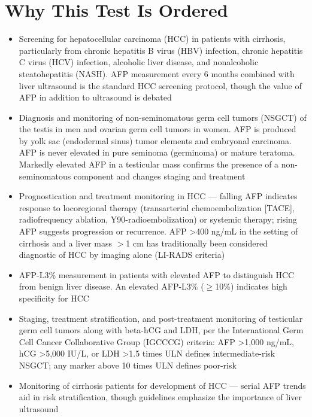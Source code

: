 \section*{Why This Test Is Ordered}
\begin{itemize}
  \item Screening for hepatocellular carcinoma (HCC) in patients with cirrhosis, particularly from chronic hepatitis B virus (HBV) infection, chronic hepatitis C virus (HCV) infection, alcoholic liver disease, and nonalcoholic steatohepatitis (NASH). AFP measurement every 6 months combined with liver ultrasound is the standard HCC screening protocol, though the value of AFP in addition to ultrasound is debated \cite{marrero2018diagnosis}
  \item Diagnosis and monitoring of non-seminomatous germ cell tumors (NSGCT) of the testis in men and ovarian germ cell tumors in women. AFP is produced by yolk sac (endodermal sinus) tumor elements and embryonal carcinoma. AFP is never elevated in pure seminoma (germinoma) or mature teratoma. Markedly elevated AFP in a testicular mass confirms the presence of a non-seminomatous component and changes staging and treatment
  \item Prognostication and treatment monitoring in HCC --- falling AFP indicates response to locoregional therapy (transarterial chemoembolization [TACE], radiofrequency ablation, Y90-radioembolization) or systemic therapy; rising AFP suggests progression or recurrence. AFP >400 ng/mL in the setting of cirrhosis and a liver mass $>$1 cm has traditionally been considered diagnostic of HCC by imaging alone (LI-RADS criteria)
  \item AFP-L3\% measurement in patients with elevated AFP to distinguish HCC from benign liver disease. An elevated AFP-L3\% ($\geq$10\%) indicates high specificity for HCC \cite{li2001afpl3}
  \item Staging, treatment stratification, and post-treatment monitoring of testicular germ cell tumors along with beta-hCG and LDH, per the International Germ Cell Cancer Collaborative Group (IGCCCG) criteria: AFP >1,000 ng/mL, hCG >5,000 IU/L, or LDH >1.5 times ULN defines intermediate-risk NSGCT; any marker above 10 times ULN defines poor-risk
  \item Monitoring of cirrhosis patients for development of HCC --- serial AFP trends aid in risk stratification, though guidelines emphasize the importance of liver ultrasound
\end{itemize}

